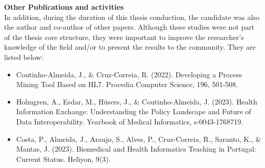 \textbf{Other Publications and activities}\\
In addition, during the duration of this thesis conduction, the candidate was also the author and co-author of other papers. Although these studies were not part of the thesis core structure, they were important to improve the researcher's knowledge of the field and/or to present the results to the community. They are listed below:\\

\begin{itemize}

\item Coutinho-Almeida, J., \& Cruz-Correia, R. (2022). Developing a Process Mining Tool Based on HL7. Procedia Computer Science, 196, 501-508.\\


\item Holmgren, A., Esdar, M., Hüsers, J., \& Coutinho-Almeida, J. (2023). Health Information Exchange: Understanding the Policy Landscape and Future of Data Interoperability. Yearbook of Medical Informatics, s-0043-1768719.\\



\item Costa, P., Almeida, J., Araujo, S., Alves, P., Cruz-Correia, R., Saranto, K., \& Mantas, J. (2023). Biomedical and Health Informatics Teaching in Portugal: Current Status. Heliyon, 9(3).\\

\end{itemize}